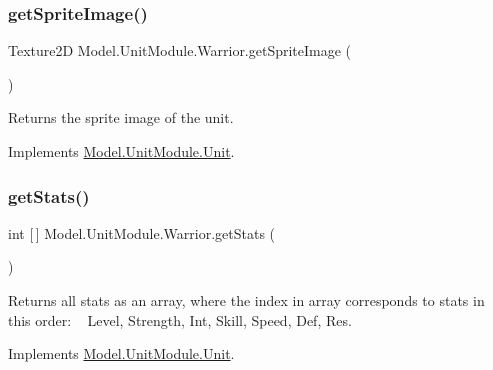 \hypertarget{class_model_1_1_unit_module_1_1_warrior_afb4b568eb1d84ec9adca68e8ca8c79b4}{}\label{class_model_1_1_unit_module_1_1_warrior_afb4b568eb1d84ec9adca68e8ca8c79b4} 
\subsubsection{\texorpdfstring{get\+Sprite\+Image()}{getSpriteImage()}}
{\footnotesize\ttfamily Texture2D Model.\+Unit\+Module.\+Warrior.\+get\+Sprite\+Image (\begin{DoxyParamCaption}{ }\end{DoxyParamCaption})\hspace{0.3cm}{\ttfamily [inline]}}

Returns the sprite image of the unit. 

Implements \hyperlink{interface_model_1_1_unit_module_1_1_unit_a797013e0463ea2e8c9ae8171f7d305f0}{Model.\+Unit\+Module.\+Unit}.

\hypertarget{class_model_1_1_unit_module_1_1_warrior_ad058a6586b28d7d23075e557a99712aa}{}\label{class_model_1_1_unit_module_1_1_warrior_ad058a6586b28d7d23075e557a99712aa} 
\subsubsection{\texorpdfstring{get\+Stats()}{getStats()}}
{\footnotesize\ttfamily int \mbox{[}$\,$\mbox{]} Model.\+Unit\+Module.\+Warrior.\+get\+Stats (\begin{DoxyParamCaption}{ }\end{DoxyParamCaption})\hspace{0.3cm}{\ttfamily [inline]}}

Returns all stats as an array, where the index in array corresponds to stats in this order\+: ~\newline
 Level, Strength, Int, Skill, Speed, Def, Res. 

Implements \hyperlink{interface_model_1_1_unit_module_1_1_unit_a32890c6e0bf19a58dde71cc4240576a8}{Model.\+Unit\+Module.\+Unit}.

\hypertarget{class_model_1_1_unit_module_1_1_warrior_a6727d75c6005f0d8e72d64ad302e4fec}{}\label{class_model_1_1_unit_module_1_1_warrior_a6727d75c6005f0d8e72d64ad302e4fec} 
